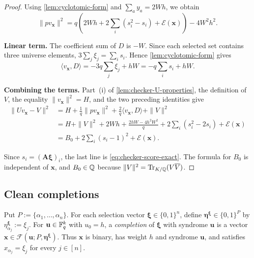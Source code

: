 \begin{proof}
Using \cref{lem:cyclotomic-form} and $\sum_a y_a=2Wh$, we obtain
\begin{equation*}
 \|pv_{\mathbf x}\|^2
 =q\left(
 2Wh+2\sum_i(s_i^2-s_i)+\mathcal E(\mathbf x)
 \right)-4W^2h^2.
\end{equation*}

\smallskip
\noindent\textbf{Linear term.}
The coefficient sum of $D$ is $-W$.  Since each selected set contains three
universe elements, $3\sum_j\xi_j=\sum_i s_i$.  Hence
\cref{lem:cyclotomic-form} gives
\begin{equation*}
 \langle v_{\mathbf x},D\rangle
 =-3q\sum_j\xi_j+hW
 =-q\sum_i s_i+hW.
\end{equation*}

\begin{samepage}
\smallskip
\noindent\textbf{Combining the terms.}
Part~(i) of \cref{lem:checker-U-properties}, the definition of
$V$, the equality $\|v_{\mathbf x}\|^2=H$, and the two preceding identities
give
\[
\begin{aligned}
 \|Uv_{\mathbf x}-V\|^2
 &=H+\frac1q\|pv_{\mathbf x}\|^2
   +\frac2q\langle v_{\mathbf x},D\rangle+\|V\|^2\\
 &=H+\|V\|^2+2Wh+\frac{2hW-4h^2W^2}{q}
   +2\sum_i(s_i^2-2s_i)+\mathcal E(\mathbf x)\\
 &=B_0+2\sum_i(s_i-1)^2+\mathcal E(\mathbf x).
\end{aligned}
\]
\end{samepage}
Since $s_i=(\mathbf A\boldsymbol\xi)_i$, the last line is
\cref{eq:checker-score-exact}.  The formula for $B_0$ is independent
of $\mathbf x$, and $B_0\in\mathbb Q$ because
$\|V\|^2=\operatorname{Tr}_{K/\mathbb Q}(V\overline V)$.
\end{proof}

\subsection{Clean completions}
\label{sec:clean-representatives}

Put $P:=\{\alpha_1,\ldots,\alpha_n\}$.  For each selection vector
$\boldsymbol\xi\in\{0,1\}^n$, define
$\boldsymbol\eta^{\boldsymbol\xi}\in\{0,1\}^P$ by
$\eta^{\boldsymbol\xi}_{\alpha_j}:=\xi_j$.
For $\mathbf u\in\mathbb F_q^k$ with $u_0=h$, a \emph{completion} of
$\boldsymbol\xi$ with syndrome $\mathbf u$ is a vector
$\mathbf x\in\mathcal F(\mathbf u;P,\boldsymbol\eta^{\boldsymbol\xi})$.
Thus $\mathbf x$ is binary, has weight $h$ and syndrome $\mathbf u$, and
satisfies $x_{\alpha_j}=\xi_j$ for every $j\in[n]$.

